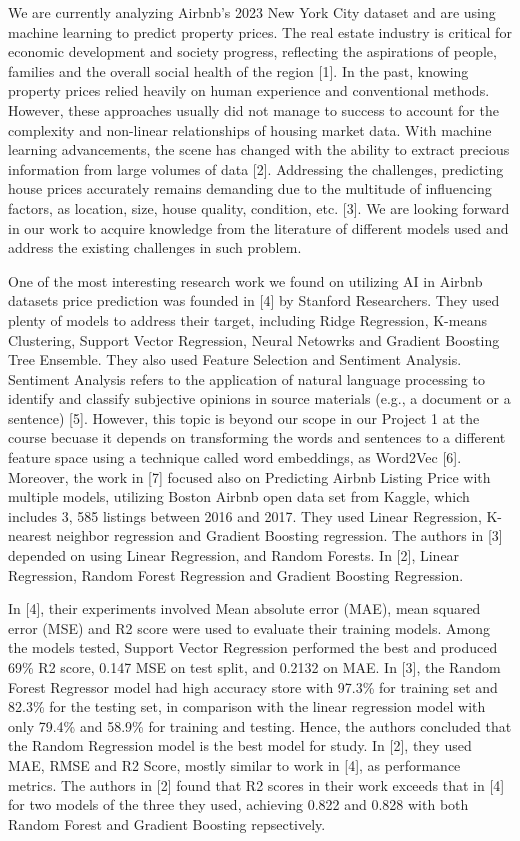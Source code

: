 \documentclass[a4paper,12pt]{article}
\begin{document}
We are currently analyzing Airbnb's 2023 New York City dataset and are using machine learning to predict property prices. The real estate industry is critical for economic development and society progress, reflecting the aspirations of people, families and the overall social health of the region [1]. In the past, knowing property prices relied heavily on human experience and conventional methods. However, these approaches usually did not manage to success to account for the complexity and non-linear relationships of housing market data. With machine learning advancements, the scene has changed with the ability to extract precious information from large volumes of data [2]. Addressing the challenges, predicting house prices accurately remains demanding due to the multitude of influencing factors, as location, size, house quality, condition, etc. [3]. We are looking forward in our work to acquire knowledge from the literature of different models used and address the existing challenges in such problem.

One of the most interesting research work we found on utilizing AI in Airbnb datasets price prediction was founded in [4] by Stanford Researchers. They used plenty of models to address their target, including Ridge Regression, K-means Clustering, Support Vector Regression, Neural Netowrks and Gradient Boosting Tree Ensemble. They also used Feature Selection and Sentiment Analysis. Sentiment Analysis refers to the application of natural language processing to identify and classify subjective opinions in source materials (e.g., a document or a sentence) [5]. However, this topic is beyond our scope in our Project 1 at the course becuase it depends on transforming the words and sentences to a different feature space using a technique called word embeddings, as Word2Vec [6]. Moreover, the work in [7] focused also on Predicting Airbnb Listing Price with multiple models, utilizing Boston Airbnb open data set from Kaggle, which includes 3, 585 listings between 2016 and 2017. They used Linear Regression, K-nearest neighbor regression and Gradient Boosting regression. The authors in [3] depended on using Linear Regression, and Random Forests. In [2], Linear Regression, Random Forest Regression and Gradient Boosting Regression.

In [4], their experiments involved Mean absolute error (MAE), mean squared error (MSE) and R2 score were used to evaluate their training models. Among the models tested, Support Vector Regression performed the best and produced 69\% R2 score, 0.147 MSE on test split, and 0.2132 on MAE. In [3], the Random Forest Regressor model had high accuracy store with 97.3\% for training set and 82.3\% for the testing set, in comparison with the linear regression model with only 79.4\% and 58.9\% for training and testing. Hence, the authors concluded that the Random Regression model is the best model for study. In [2], they used MAE, RMSE and R2 Score, mostly similar to work in [4], as performance metrics. The authors in [2] found that R2 scores in their work exceeds that in [4] for two models of the three they used, achieving 0.822 and 0.828 with both Random Forest and Gradient Boosting repsectively.
\end{document}
